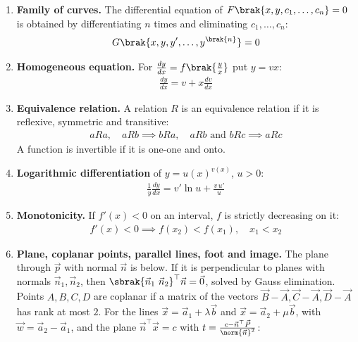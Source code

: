 \begin{enumerate}[label=\thesubsection.\arabic*, ref=\thesubsection.\theenumi, itemsep=0pt]
\begin{align}
a * b = b * a \quad \forall\, a, b \in S
\label{eq:EE26BTECH11225-binop}
\end{align}
\item \textbf{Family of curves.} The differential equation of $F\brak{x, y, c_1, \ldots, c_n} = 0$ is obtained by differentiating $n$ times and eliminating $c_1, \ldots, c_n$:
\begin{align}
G\brak{x, y, y', \ldots, y^{\brak{n}}} = 0
\label{eq:EE26BTECH11225-family}
\end{align}
\item \textbf{Homogeneous equation.} For $\frac{dy}{dx} = f\brak{\frac{y}{x}}$ put $y = vx$:
\begin{align}
\frac{dy}{dx} = v + x\frac{dv}{dx}
\label{eq:EE26BTECH11225-homog}
\end{align}
\item \textbf{Equivalence relation.} A relation $R$ is an equivalence relation if it is reflexive, symmetric and transitive:
\begin{align}
aRa, \quad aRb \implies bRa, \quad aRb \text{ and } bRc \implies aRc
\label{eq:EE26BTECH11225-equiv}
\end{align}
A function is invertible if it is one-one and onto.
\item \textbf{Logarithmic differentiation} of $y = u(x)^{v(x)}$, $u > 0$:
\begin{align}
\frac{1}{y}\frac{dy}{dx} = v'\ln u + \frac{v\,u'}{u}
\label{eq:EE26BTECH11225-logdiff}
\end{align}
\item \textbf{Monotonicity.} If $f'(x) < 0$ on an interval, $f$ is strictly decreasing on it:
\begin{align}
f'(x) < 0 \implies f(x_2) < f(x_1), \quad x_1 < x_2
\label{eq:EE26BTECH11225-mono}
\end{align}
\item \textbf{Plane, coplanar points, parallel lines, foot and image.} The plane through $\vec{p}$ with normal $\vec{n}$ is below. If it is perpendicular to planes with normals $\vec{n}_1, \vec{n}_2$, then $\sbrak{\vec{n}_1 \ \vec{n}_2}^{\top}\vec{n} = \vec{0}$, solved by Gauss elimination. Points $A, B, C, D$ are coplanar if a matrix of the vectors $\vec{B}-\vec{A}, \vec{C}-\vec{A}, \vec{D}-\vec{A}$ has rank at most $2$. For the lines $\vec{x} = \vec{a}_1 + \lambda\vec{b}$ and $\vec{x} = \vec{a}_2 + \mu\vec{b}$, with $\vec{w} = \vec{a}_2 - \vec{a}_1$, and the plane $\vec{n}^{\top}\vec{x} = c$ with $t = \frac{c - \vec{n}^{\top}\vec{P}}{\norm{\vec{n}}^2}$:

\end{enumerate}
